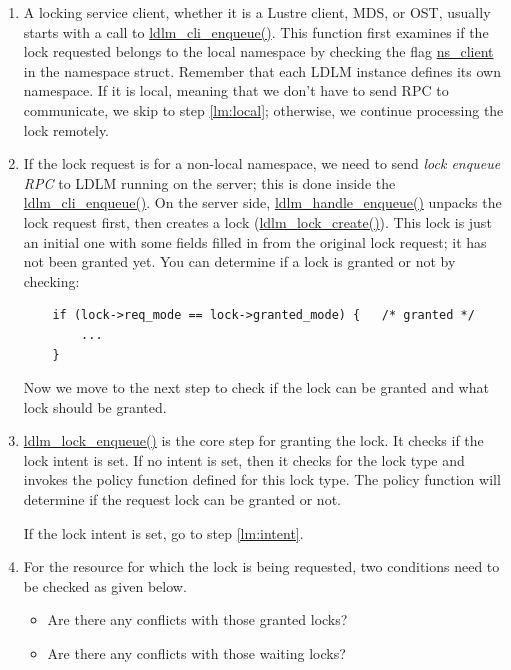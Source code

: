 \begin{enumerate}

\item A locking service client, whether it is a Lustre client, MDS, or OST,
usually starts with a call to \url{ldlm_cli_enqueue()}. This function first
examines if the lock requested belongs to the local namespace by checking the
flag \url{ns_client} in the namespace struct.  Remember that each LDLM instance
defines its own namespace.  If it is local, meaning that we don't have to send
RPC to communicate, we skip to step \ref{lm:local}; otherwise, we continue
processing the lock remotely.

\item If the lock request is for a non-local namespace, we need to send
\textit{lock enqueue RPC} to LDLM running on the server; this is done inside
the \url{ldlm_cli_enqueue()}. On the server side, \url{ldlm_handle_enqueue()}
unpacks the lock request first, then creates a lock (\url{ldlm_lock_create()}).
This lock is just an initial one with some fields filled in from the original
lock request; it has not been granted yet. You can determine if a lock is
granted or not by checking:

    \begin{Verbatim}
    if (lock->req_mode == lock->granted_mode) {   /* granted */
        ...
    }
    \end{Verbatim}

Now we move to the next step to check if the lock can be granted and what lock
should be granted.

\item \url{ldlm_lock_enqueue()} is the core step for granting the lock. It
checks if the lock intent is set. If no intent is set, then it checks for the
lock type and invokes the policy function defined for this lock type. The
policy function will determine if the request lock can be granted or not. 

If the lock intent is set, go to step \ref{lm:intent}.

\item For the resource for which the lock is being requested, two conditions
need to be checked as given below.
  
  \begin{itemize}
  \item Are there any conflicts with those granted locks?
  \item Are there any conflicts with those waiting locks?
  \end{itemize}


\end{enumerate}
